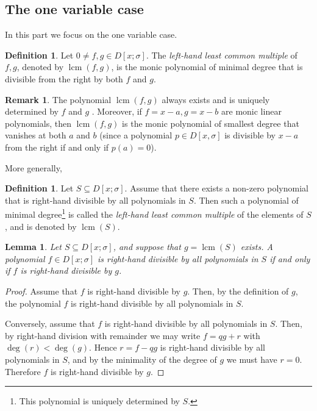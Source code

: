 \documentclass[11pt,reqno]{amsart}
\newtheorem{lem}[thm]{Lemma}
\theoremstyle{definition}
\newtheorem{defn}[thm]{Definition}
\newtheorem{rmk}[thm]{Remark}
\DeclareMathOperator{\lcm}{lcm}
\begin{document}
\subsection{The one variable case} In this part we focus on the one variable case. 
\begin{defn}
Let $0 \neq f,g \in D[x;\sigma]$. The \emph{ left-hand least common multiple} of $f,g$, denoted by $\lcm(f,g)$, is the monic polynomial of minimal degree that is divisible from the right by both $f$ and $g$.
\end{defn}
\begin{rmk}
 The polynomial $\lcm(f,g)$ always exists and is uniquely determined by $f$ and $g$ \cite[p.~485]{Ore33}. Moreover, if $f = x-a,g = x-b$ are monic linear polynomials, then $\lcm(f,g)$ is the monic polynomial of smallest degree that vanishes at both $a$ and $b$ (since a polynomial $p \in D[x,\sigma]$ is divisible by $x-a$ from the right if and only if $p(a) = 0$). 
\end{rmk}
More generally, 
\begin{defn}
Let $S \subseteq D[x;\sigma]$. Assume that there exists a non-zero polynomial that is right-hand divisible by all polynomials in $S$. Then such a polynomial of minimal degree\footnote{This polynomial is uniquely determined by $S$.} is called the \emph{left-hand least common multiple} of the elements of $S$, and is denoted by $\lcm(S)$. 
\end{defn}

\begin{lem}\label{union} Let $S \subseteq D[x;\sigma]$, and suppose that $g = \lcm(S)$ exists. A polynomial $f \in D[x;\sigma]$ is right-hand divisible by all polynomials in $S$ if and only if $f$ is right-hand divisible by $g$. 
\end{lem} 
\begin{proof} 
Assume that $f$ is right-hand divisible by $g$. Then, by the definition of $g$, the polynomial $f$ is right-hand divisible by all polynomials in $S$.

Conversely, assume that $f$ is right-hand divisible by all polynomials in $S$. Then, by right-hand division with remainder we may write $f = qg+r$ with $\deg(r) < \deg(g)$. Hence $r = f-qg$ is right-hand divisible by all polynomials in $S$, and by the minimality of the degree of $g$ we must have $r = 0$. Therefore $f$ is right-hand divisible by $g$. 
\end{proof}
\end{document}
